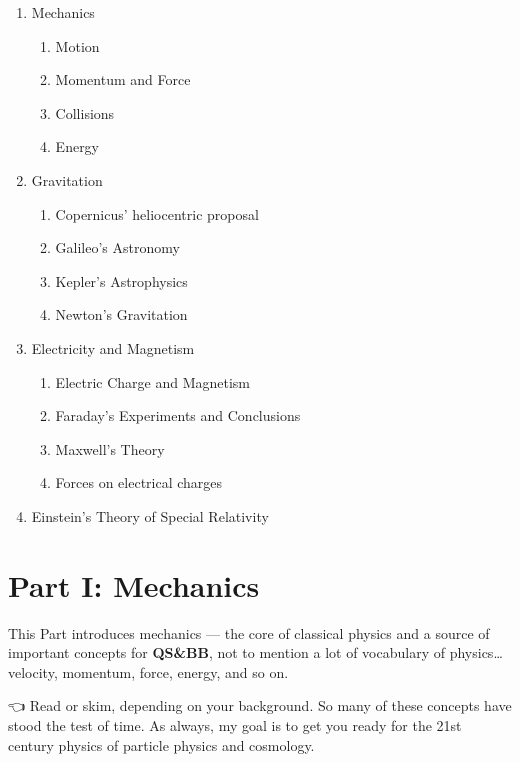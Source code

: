 \documentclass[
  letterpaper,
  DIV=11,
  numbers=noendperiod,
  oneside]{scrreprt}
\providecommand{\tightlist}{%
  \setlength{\itemsep}{0pt}\setlength{\parskip}{0pt}}\usepackage{longtable,booktabs,array}
\begin{document}
\begin{enumerate}
\def\labelenumi{\arabic{enumi}.}
\tightlist
\item
  Mechanics

  \begin{enumerate}
  \def\labelenumii{\arabic{enumii}.}
  \tightlist
  \item
    Motion
  \item
    Momentum and Force
  \item
    Collisions
  \item
    Energy
  \end{enumerate}
\item
  Gravitation

  \begin{enumerate}
  \def\labelenumii{\arabic{enumii}.}
  \tightlist
  \item
    Copernicus' heliocentric proposal
  \item
    Galileo's Astronomy
  \item
    Kepler's Astrophysics
  \item
    Newton's Gravitation
  \end{enumerate}
\item
  Electricity and Magnetism

  \begin{enumerate}
  \def\labelenumii{\arabic{enumii}.}
  \tightlist
  \item
    Electric Charge and Magnetism
  \item
    Faraday's Experiments and Conclusions
  \item
    Maxwell's Theory
  \item
    Forces on electrical charges
  \end{enumerate}
\item
  Einstein's Theory of Special Relativity
\end{enumerate}

\part{Part I: Mechanics}

This Part introduces mechanics --- the core of classical physics and a
source of important concepts for \textbf{QS\&BB}, not to mention a lot
of vocabulary of physics\ldots velocity, momentum, force, energy, and so
on.

👈 Read or skim, depending on your background. So many of these concepts
have stood the test of time. As always, my goal is to get you ready for
the 21st century physics of particle physics and cosmology.
\end{document}
